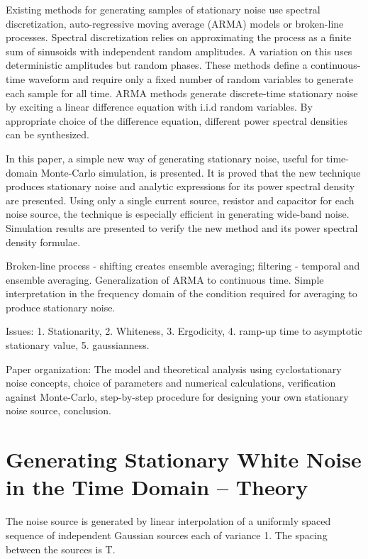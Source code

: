 Existing methods for generating samples of stationary noise use spectral
discretization, auto-regressive moving average (ARMA) models or broken-line
processes. Spectral discretization relies on approximating the process as a
finite sum of sinusoids with independent random amplitudes\cite{reference}.
A variation on this uses deterministic amplitudes but random
phases\cite{reference}. These methods define a continuous-time waveform and
require only a fixed number of random variables to generate each sample for
all time. ARMA methods generate discrete-time stationary noise by exciting a
linear difference equation with i.i.d random variables\cite{reference}. By
appropriate choice of the difference equation, different power spectral
densities can be synthesized.

In this paper, a simple new way of generating stationary noise, useful for
time-domain Monte-Carlo simulation, is presented. It is proved that the new
technique produces stationary noise and analytic expressions for its power
spectral density are presented. Using only a single current source, resistor
and capacitor for each noise source, the technique is especially efficient
in generating wide-band noise. Simulation results are presented to verify
the new method and its power spectral density formulae.

Broken-line process - shifting creates ensemble averaging; filtering -
temporal and ensemble averaging. Generalization of ARMA to continuous time.
Simple interpretation in the frequency domain of the condition required for
averaging to produce stationary noise.

Issues: 1. Stationarity, 2. Whiteness, 3. Ergodicity, 4. ramp-up time
	to asymptotic stationary value, 5. gaussianness.

Paper organization: The model and theoretical analysis using cyclostationary
noise concepts, choice of parameters and numerical calculations,
verification against Monte-Carlo, step-by-step procedure for
designing your own stationary noise source, conclusion.

\section{Generating Stationary White Noise in the Time Domain -- Theory}
\label{sec:theory}
The noise source is generated by linear interpolation of a uniformly spaced
sequence of independent Gaussian sources each of variance 1. The spacing
between the sources is T.

